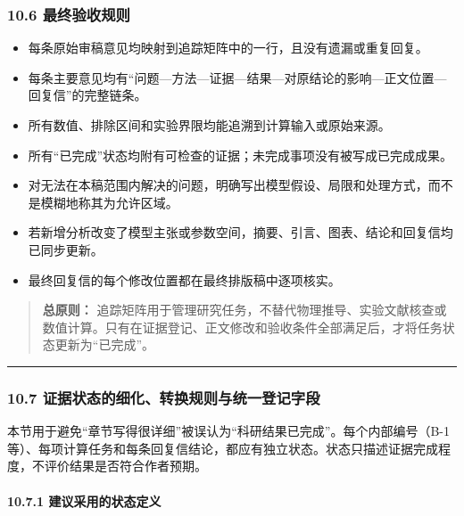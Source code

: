 \documentclass[
]{article}
\providecommand{\tightlist}{%
  \setlength{\itemsep}{0pt}\setlength{\parskip}{0pt}}
\begin{document}
\subsubsection{10.6
最终验收规则}\label{ux6700ux7ec8ux9a8cux6536ux89c4ux5219}

\begin{itemize}
\tightlist
\item[$\square$]
  每条原始审稿意见均映射到追踪矩阵中的一行，且没有遗漏或重复回复。
\item[$\square$]
  每条主要意见均有``问题---方法---证据---结果---对原结论的影响---正文位置---回复信''的完整链条。
\item[$\square$]
  所有数值、排除区间和实验界限均能追溯到计算输入或原始来源。
\item[$\square$]
  所有``已完成''状态均附有可检查的证据；未完成事项没有被写成已完成成果。
\item[$\square$]
  对无法在本稿范围内解决的问题，明确写出模型假设、局限和处理方式，而不是模糊地称其为允许区域。
\item[$\square$]
  若新增分析改变了模型主张或参数空间，摘要、引言、图表、结论和回复信均已同步更新。
\item[$\square$]
  最终回复信的每个修改位置都在最终排版稿中逐项核实。
\end{itemize}

\begin{quote}
\textbf{总原则：}
追踪矩阵用于管理研究任务，不替代物理推导、实验文献核查或数值计算。只有在证据登记、正文修改和验收条件全部满足后，才将任务状态更新为``已完成''。
\end{quote}

\begin{center}\rule{0.5\linewidth}{0.5pt}\end{center}

\subsubsection{10.7
证据状态的细化、转换规则与统一登记字段}\label{ux8bc1ux636eux72b6ux6001ux7684ux7ec6ux5316ux8f6cux6362ux89c4ux5219ux4e0eux7edfux4e00ux767bux8bb0ux5b57ux6bb5}

本节用于避免``章节写得很详细''被误认为``科研结果已完成''。每个内部编号（B-1
等）、每项计算任务和每条回复信结论，都应有独立状态。状态只描述证据完成程度，不评价结果是否符合作者预期。

\paragraph{10.7.1
建议采用的状态定义}\label{ux5efaux8baeux91c7ux7528ux7684ux72b6ux6001ux5b9aux4e49}
\end{document}
